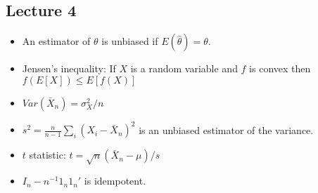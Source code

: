 \documentclass[11pt]{article} %
\begin{document}
\subsection{Lecture 4}
\begin{itemize}
\item An estimator of $\theta$ is unbiased if $E(\hat{\theta}) = \theta $.
\item Jensen's inequality: If $X$ is a random variable and $f$ is convex then $f(E[X]) \leq E[f(X)]$
\item $Var(\bar{X}_n) = \sigma_X^2/n$
\item $s^2 = \frac{n}{n-1} \sum_i (X_i - \bar{X}_n)^2$ is an unbiased estimator of the variance.
\item $t$ statistic: $t = \sqrt{n}(\bar{X}_n - \mu)/s$
\item $I_n - n^{-1} 1_n1_n'$ is idempotent.
\end{itemize}
\end{document}
